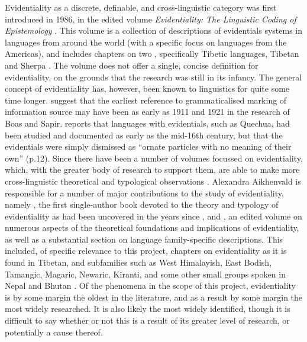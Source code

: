Evidentiality as a discrete, definable, and cross-linguistic category was first introduced in 1986, in the edited volume \textit{Evidentiality: The Linguistic Coding of Epistemology} \cite{ChafeNichols1986}. This volume is a collection of descriptions of evidentials systems in languages from around the world (with a specific focus on languages from the Americas), and includes chapters on two \lfam, specifically Tibetic languages, Tibetan \cite{DeLancey1986} and Sherpa \cite{Woodbury1986}. The volume does not offer a single, concise definition for evidentiality, on the grounds that the research was still in its infancy. The general concept of evidentiality has, however, been known to linguistics for quite some time longer.  suggest that the earliest reference to grammaticalised marking of information source may have been as early as 1911 and 1921 in the research of Boas and Sapir.  reports that languages with evidentials, such as Quechua, had been studied and documented as early as the mid-16th century, but that the evidentials were simply dismissed as ``ornate particles with no meaning of their own'' (p.12). Since  there have been a number of volumes focussed on evidentiality, which, with the greater body of research to support them, are able to make more cross-linguistic theoretical and typological observations \cite{DendaleTasmowski2001}. Alexandra Aikhenvald is responsible for a number of major contributions to the study of evidentiality, namely , the first single-author book devoted to the theory and typology of evidentiality as had been uncovered in the years since , and , an edited volume on numerous aspects of the theoretical foundations and implications of evidentiality, as well as a substantial section on language family-specific descriptions. This included, of specific relevance to this project, chapters on evidentiality as it is found in Tibetan, and subfamilies such as West Himalayish, East Bodish, Tamangic, Magaric, Newaric, Kiranti, and some other small groups spoken in Nepal and Bhutan \cites{DeLancey2018Evidentiality}{Hyslop2018Evidentiality}. Of the phenomena in the scope of this project, evidentiality is by some margin the oldest in the literature, and as a result by some margin the most widely researched. It is also likely the most widely identified, though it is difficult to say whether or not this is a result of its greater level of research, or potentially a cause thereof.



